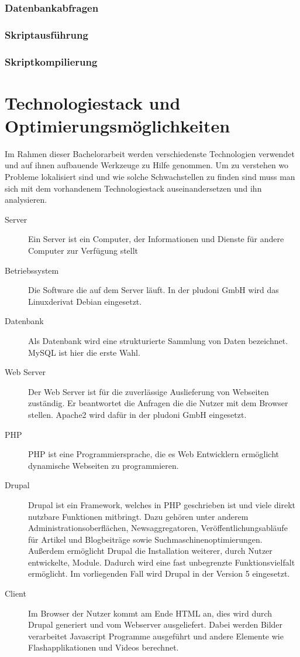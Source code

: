 \subsubsection{Datenbankabfragen}

\subsubsection{Skriptausführung}
\subsubsection{Skriptkompilierung}

\section{Technologiestack und Optimierungsmöglichkeiten}
Im Rahmen dieser Bachelorarbeit werden verschiedenste Technologien verwendet und auf ihnen aufbauende Werkzeuge zu Hilfe genommen. Um zu verstehen wo Probleme lokalisiert sind und wie solche Schwachstellen zu finden sind muss man sich mit dem vorhandenem Technologiestack auseinandersetzen und ihn analysieren.
\begin{description}
  \item[Server] Ein Server ist ein Computer, der Informationen und Dienste für andere Computer zur Verfügung stellt
  \item[Betriebssystem] Die Software die auf dem Server läuft. In der pludoni GmbH wird das Linuxderivat Debian eingesetzt.
  \item[Datenbank] Als Datenbank wird eine strukturierte Sammlung von Daten bezeichnet. MySQL ist hier die erste Wahl.
  \item[Web Server] Der Web Server ist für die zuverlässige Auslieferung von Webseiten zuständig. Er beantwortet die Anfragen die die Nutzer mit dem Browser stellen. Apache2 wird dafür in der pludoni GmbH eingesetzt.
  \item[PHP] PHP ist eine Programmiersprache, die es Web Entwicklern ermöglicht dynamische Webseiten zu programmieren.
  \item[Drupal] Drupal ist ein Framework, welches in PHP geschrieben ist und viele direkt nutzbare Funktionen mitbringt. Dazu gehören unter anderem Administrationsoberflächen, Newsaggregatoren, Veröffentlichungsabläufe für Artikel und Blogbeiträge sowie Suchmaschinenoptimierungen. Außerdem ermöglicht Drupal die Installation weiterer, durch Nutzer entwickelte, Module. Dadurch wird eine fast unbegrenzte Funktionsvielfalt ermöglicht. Im vorliegenden Fall wird Drupal in der Version 5 eingesetzt.
  \item[Client] Im Browser der Nutzer kommt am Ende HTML an, dies wird durch Drupal generiert und vom Webserver ausgeliefert. Dabei werden Bilder verarbeitet Javascript Programme ausgeführt und andere Elemente wie Flashapplikationen und Videos berechnet. 
\end{description}

